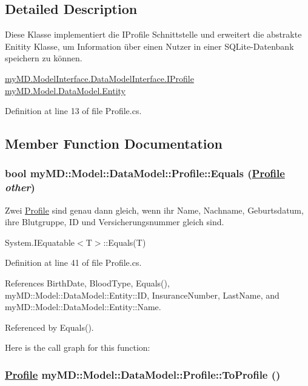 \subsection{Detailed Description}
Diese Klasse implementiert die IProfile Schnittstelle und erweitert die abstrakte Enitity Klasse, um Information \"{u}ber einen Nutzer in einer SQLite-Datenbank speichern zu k\"{o}nnen. 

\hyperlink{interfacemy_m_d_1_1_model_interface_1_1_data_model_interface_1_1_i_profile}{my\-MD.Model\-Interface.Data\-Model\-Interface.IProfile} \hyperlink{classmy_m_d_1_1_model_1_1_data_model_1_1_entity}{my\-MD.Model.Data\-Model.Entity} 



Definition at line 13 of file Profile.cs.

\subsection{Member Function Documentation}
\hypertarget{classmy_m_d_1_1_model_1_1_data_model_1_1_profile_e81d68dfc88d80965d87424b016e626d}{
\subsubsection[Equals]{\setlength{\rightskip}{0pt plus 5cm}bool my\-MD::Model::Data\-Model::Profile::Equals (\hyperlink{classmy_m_d_1_1_model_1_1_data_model_1_1_profile}{Profile} {\em other})}}
\label{d6/d2c/classmy_m_d_1_1_model_1_1_data_model_1_1_profile_e81d68dfc88d80965d87424b016e626d}


Zwei \hyperlink{classmy_m_d_1_1_model_1_1_data_model_1_1_profile}{Profile} sind genau dann gleich, wenn ihr Name, Nachname, Geburtsdatum, ihre Blutgruppe, ID und Versicherungsnummer gleich sind. 

System.IEquatable$<$T$>$::Equals(T) 

Definition at line 41 of file Profile.cs.

References Birth\-Date, Blood\-Type, Equals(), my\-MD::Model::Data\-Model::Entity::ID, Insurance\-Number, Last\-Name, and my\-MD::Model::Data\-Model::Entity::Name.

Referenced by Equals().

Here is the call graph for this function:\hypertarget{classmy_m_d_1_1_model_1_1_data_model_1_1_profile_9e2661eb12db275911475edec4a72773}{
\subsubsection[ToProfile]{\setlength{\rightskip}{0pt plus 5cm}\hyperlink{classmy_m_d_1_1_model_1_1_data_model_1_1_profile}{Profile} my\-MD::Model::Data\-Model::Profile::To\-Profile ()}}
\label{d6/d2c/classmy_m_d_1_1_model_1_1_data_model_1_1_profile_9e2661eb12db275911475edec4a72773}


